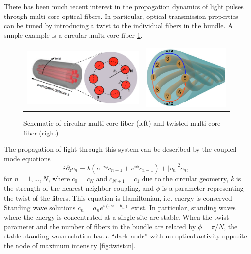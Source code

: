 \documentclass[12pt,reqno,oneside]{article}
\theoremstyle{definition}
\theoremstyle{remark}
\begin{document}
There has been much recent interest in the propagation dynamics of light pulses through multi-core optical fibers. In particular, optical transmission properties can be tuned by introducing a twist to the individual fibers in the bundle. A simple example is a circular multi-core fiber \cite{Longhi2016,CastroCastro2016,Parto2017} \cref{fig:twist}.
\begin{figure}[H]
\begin{center}
\begin{tabular}{cc}
\includegraphics[width=7cm]{images/twist2.png} &
\includegraphics[width=5cm]{images/twistmulticore.png}
\end{tabular}
\end{center}
\caption{Schematic of circular multi-core fiber \cite{Longhi2016} (left) and twisted multi-core fiber \cite{Parto2017} (right).}
\label{fig:twist}
\end{figure}
The propagation of light through this system can be described by the coupled mode equations
\begin{equation*}
i \partial_z c_n = k \left(e^{-i\phi}c_{n+1} + e^{i\phi}c_{n-1}\right) + |c_n|^2 c_n,
\end{equation*}
for $n = 1, \dots, N$, where $c_0 = c_{N}$ and $c_{N+1} = c_1$ due to the circular geometry, $k$ is the strength of the nearest-neighbor coupling, and $\phi$ is a parameter representing the twist of the fibers. This equation is Hamiltonian, i.e. energy is conserved. Standing wave solutions $c_n = a_n e^{i (\omega z + \theta_n) }$ exist.  In particular, standing waves where the energy is concentrated at a single site are stable. When the twist parameter and the number of fibers in the bundle are related by $\phi = \pi/N$, the stable standing wave solution has a ``dark node'' with no optical activity opposite the node of maximum intensity \cref{fig:twistcn}. 
\end{document}
